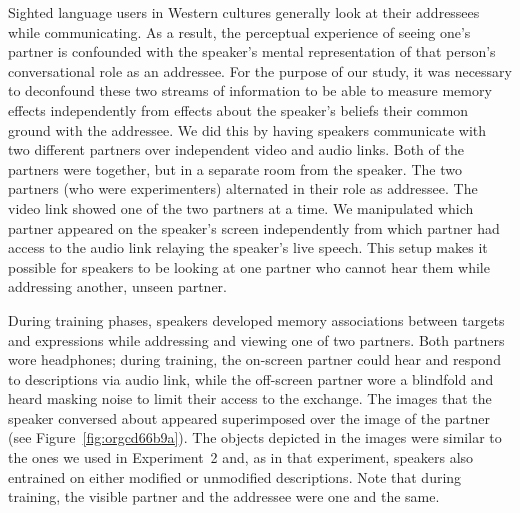 \documentclass[natbib,doc,a4paper]{apa6}
\begin{document}
Sighted language users in Western cultures generally look at their addressees while communicating. As a result, the perceptual experience of seeing one's partner is confounded with the speaker's mental representation of that person's conversational role as an addressee. For the purpose of our study, it was necessary to deconfound these two streams of information to be able to measure memory effects independently from effects about the speaker's beliefs their common ground with the addressee.  We did this by having speakers communicate with two different partners over independent video and audio links. Both of the partners were together, but in a separate room from the speaker.  The two partners (who were experimenters) alternated in their role as addressee.  The video link showed one of the two partners at a time. We manipulated which partner appeared on the speaker's screen independently from which partner had access to the audio link relaying the speaker's live speech. This setup makes it possible for speakers to be looking at one partner who cannot hear them while addressing another, unseen partner.

During training phases, speakers developed memory associations between targets and expressions while addressing and viewing one of two partners. Both partners wore headphones; during training, the on-screen partner could hear and respond to descriptions via audio link, while the off-screen partner wore a blindfold and heard masking noise to limit their access to the exchange.  The images that the speaker conversed about appeared superimposed over the image of the partner (see Figure~\ref{fig:orgcd66b9a}). The objects depicted in the images were similar to the ones we used in Experiment~2 and, as in that experiment, speakers also entrained on either modified or unmodified descriptions. Note that during training, the visible partner and the addressee were one and the same.
\end{document}
